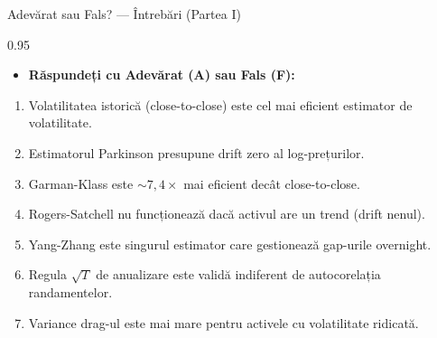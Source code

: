 \documentclass[9pt, aspectratio=169, t]{beamer}
\begin{document}
\begin{frame}[shrink=10]{Adevărat sau Fals? --- Întrebări (Partea I)}
\begin{cminipage}{0.95\textwidth}
    \begin{itemize}\setlength{\itemsep}{0pt}
        \item \textbf{Răspundeți cu Adevărat (A) sau Fals (F):}
    \end{itemize}
    \vspace{0.3cm}
    \begin{enumerate}\setlength{\itemsep}{0pt}
        \item Volatilitatea istorică (close-to-close) este cel mai eficient estimator de volatilitate.
        \item Estimatorul Parkinson presupune drift zero al log-prețurilor.
        \item Garman-Klass este $\sim 7{,}4\times$ mai eficient decât close-to-close.
        \item Rogers-Satchell nu funcționează dacă activul are un trend (drift nenul).
        \item Yang-Zhang este singurul estimator care gestionează gap-urile overnight.
        \item Regula $\sqrt{T}$ de anualizare este validă indiferent de autocorelația randamentelor.
        \item Variance drag-ul este mai mare pentru activele cu volatilitate ridicată.
    \end{enumerate}
\end{cminipage}
\end{frame}
\end{document}
